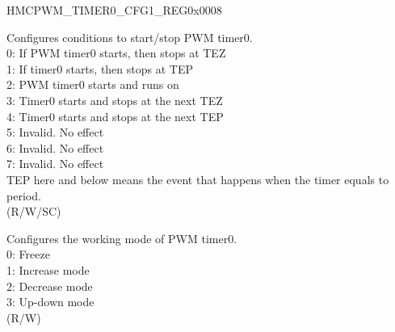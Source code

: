 \begin{register}{H}{MCPWM\_TIMER0\_CFG1\_REG}{0x0008}\label{regdesc:MCPWMTIMER0CFG1REG}
%
%
%
\regnewline%
\begin{regdesc}\begin{reglist}
\label{fielddesc:MCPWMTIMER0START}\item [MCPWM\_TIMER0\_START] Configures conditions to start/stop PWM timer0. \\
0: If PWM timer0 starts, then stops at TEZ\\
1: If timer0 starts, then stops at TEP\\
2: PWM timer0 starts and runs on\\
3: Timer0 starts and stops at the next TEZ\\
4: Timer0 starts and stops at the next TEP\\
5: Invalid. No effect\\
6: Invalid. No effect\\
7: Invalid. No effect\\
TEP here and below means the event that happens when the timer equals to period. \\
(R/W/SC)
\label{fielddesc:MCPWMTIMER0MOD}\item [MCPWM\_TIMER0\_MOD] Configures the working mode of PWM timer0.
\\0: Freeze
\\1: Increase mode
\\2: Decrease mode
\\3: Up-down mode
\\(R/W)
\end{reglist}\end{regdesc}
\end{register}


